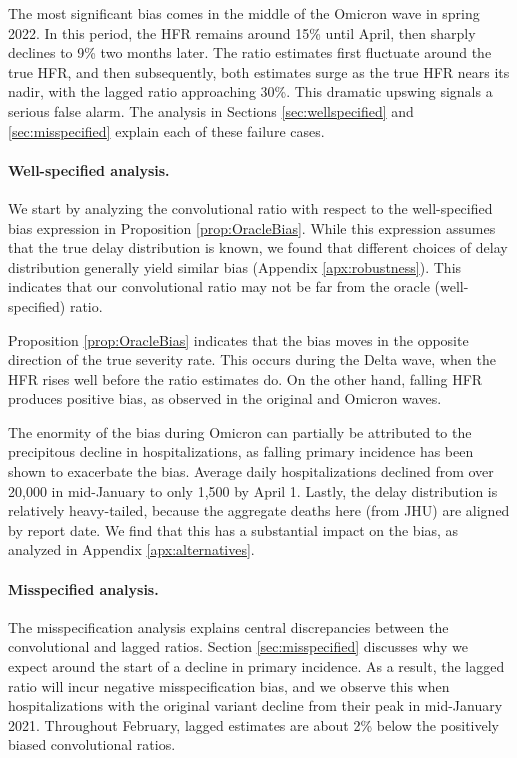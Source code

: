 \documentclass{article}
\begin{document}
The most significant bias comes in the middle of the Omicron wave in spring
2022. In this period, the HFR remains around 15\% until April, then sharply
declines to 9\% two months later. The ratio estimates first fluctuate around the
true HFR, and then subsequently, both estimates surge as the true HFR nears
its nadir, with the lagged ratio approaching 30\%. This dramatic upswing signals
a serious false alarm.  The analysis in Sections \ref{sec:wellspecified} and
\ref{sec:misspecified} explain each of these failure cases. 

\paragraph{Well-specified analysis.}

We start by analyzing the convolutional ratio with respect to the well-specified
bias expression in Proposition \ref{prop:OracleBias}. While this expression
assumes that the true delay distribution is known, we found that different
choices of delay distribution generally yield similar bias (Appendix
\ref{apx:robustness}). This indicates that our convolutional ratio may 
not be far from the oracle (well-specified) ratio. 

Proposition \ref{prop:OracleBias} indicates that the bias moves in the opposite
direction of the true severity rate. This occurs during the Delta wave, when the
HFR rises well before the ratio estimates do. On the other hand, falling HFR
produces positive bias, as observed in the original and Omicron waves.  

The enormity of the bias during Omicron can partially be attributed to the
precipitous decline in hospitalizations, as falling primary incidence has been
shown to exacerbate the bias. Average daily hospitalizations declined from over
20,000 in mid-January to only 1,500 by April 1. Lastly, the delay distribution
is relatively heavy-tailed, because the aggregate deaths here (from JHU) are
aligned by report date. We find that this has a substantial impact on the bias, 
as analyzed in Appendix \ref{apx:alternatives}.

\paragraph{Misspecified analysis.}

The misspecification analysis explains central discrepancies between the
convolutional and lagged ratios. Section \ref{sec:misspecified} discusses why we 
expect  around the start of a decline in primary
incidence. As a result, the lagged ratio will incur negative misspecification
bias, and we observe this when hospitalizations with the original variant
decline from their peak in mid-January 2021. Throughout February, lagged
estimates are about 2\% below the positively biased convolutional ratios.   
\end{document}
